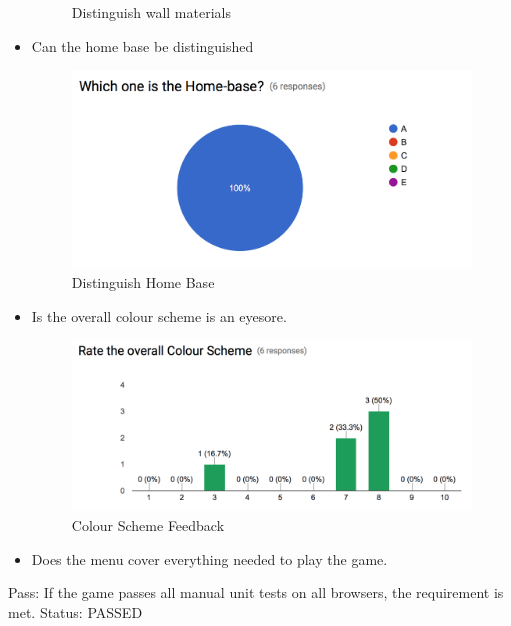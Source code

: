 \documentclass{article}
\begin{document}
\begin{itemize}
\begin{figure}[H]
	\caption{Distinguish wall materials}
\end{figure}
\item Can the home base be distinguished
\begin{figure}[H]
	\centering
	\includegraphics[width=\textwidth]{./Figures/3.png}
	\caption{Distinguish Home Base}
\end{figure}
\item Is the overall colour scheme is an eyesore.
\begin{figure}[H]
	\centering
	\includegraphics[width=\textwidth]{./Figures/7.png}
	\caption{Colour Scheme Feedback}
\end{figure}
\item Does the menu cover everything needed to play the game.
\end{itemize}
Pass:  If the game passes all manual unit tests on all browsers, the requirement
 is met.\newline
Status: PASSED
\end{document}
